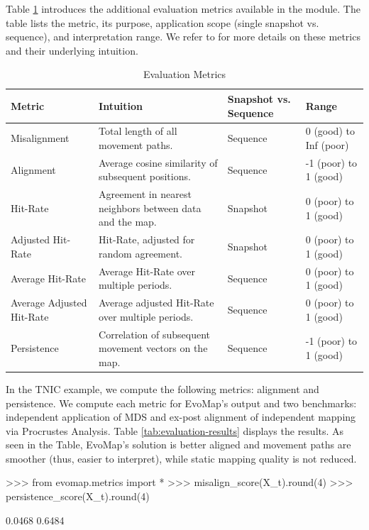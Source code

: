 \documentclass[article]{jss}
\begin{document}
Table \ref{tab:evaluation-metrics} introduces the additional evaluation metrics available in the  module. 
The table lists the metric, its purpose, application scope (single snapshot vs. sequence), and interpretation range. We refer to 
\cite{Matthe+Ringel+Skiera:2023} for more
details on these metrics and their underlying intuition.

\begin{table}[ht]
  \centering
  \begin{tabular}{p{3cm}p{4.5cm}p{2.5cm}p{3cm}}
  \hline
  \textbf{Metric} & \textbf{Intuition} & \textbf{Snapshot \newline vs. Sequence} & \textbf{Range} \\ \hline
  Misalignment & Total length of all movement paths. & Sequence & 0 (good) to Inf (poor) \\ 
  Alignment & Average cosine similarity of subsequent positions. & Sequence & -1 (poor) to 1 (good) \\ 
  Hit-Rate & Agreement in nearest neighbors between data and the map. & Snapshot & 0 (poor) to 1 (good) \\ 
  Adjusted \newline Hit-Rate & Hit-Rate, adjusted for random agreement. & Snapshot & 0 (poor) to 1 (good) \\ 
  Average Hit-Rate & Average Hit-Rate over multiple periods. & Sequence & 0 (poor) to 1 (good) \\ 
  Average Adjusted Hit-Rate & Average adjusted Hit-Rate over multiple periods. & Sequence & 0 (poor) to 1 (good) \\ 
  Persistence & Correlation of subsequent movement vectors on the map. & Sequence & -1 (poor) to 1 (good) \\ \hline
  \end{tabular}
  \caption{\label{tab:evaluation-metrics} Evaluation Metrics}
\end{table}

In the TNIC example, we compute the following metrics: alignment and persistence. 
We compute each metric for EvoMap's output and two benchmarks: independent application of MDS and ex-post alignment of independent mapping via 
Procrustes Analysis. Table \ref{tab:evaluation-results} displays the results. As seen in the Table, EvoMap's solution is 
better aligned and movement paths are smoother (thus, easier to interpret), while static mapping quality is not reduced. 

\begin{CodeChunk}
\begin{CodeInput}
>>> from evomap.metrics import *
>>> misalign_score(X_t).round(4)
>>> persistence_score(X_t).round(4)
\end{CodeInput}
\begin{CodeOutput}
0.0468
0.6484
\end{CodeOutput}
\end{CodeChunk}
\end{document}
